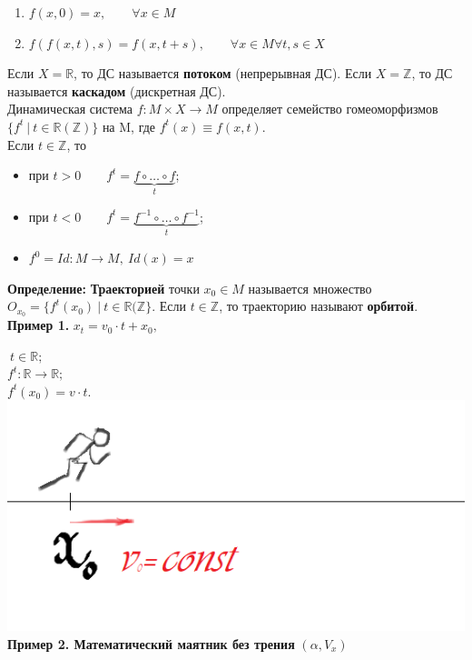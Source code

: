 \documentclass[12pt,a4paper]{article}
\begin{document}
\begin{enumerate}
\item $f(x,0) = x,\qquad \forall x \in M$
\item $f(f(x,t),s) = f(x, t+s),\qquad \forall x \in M \forall t,s \in X$ 
\end{enumerate} 

Если $X = \mathbb{R}$, то ДС называется \textbf{потоком} (непрерывная ДС).
Если $X = \mathbb{Z}$, то ДС называется \textbf{каскадом} (дискретная ДС).\\

Динамическая система $f:M\times X \rightarrow M$ определяет семейство гомеоморфизмов $\{ f^t~|~ t \in \mathbb{R}(\mathbb{Z}) \}$ на M, где $f^t(x) \equiv f(x,t)$. \\

Если $t \in \mathbb{Z}$, то
\begin{itemize}
\item при $t > 0 \qquad f^t = \underbrace{f \circ \ldots \circ f}_t$;
\item при $t < 0 \qquad f^t = \underbrace{f^{-1} \circ \ldots \circ f^{-1}}_t$;
\item $f^0 = Id:M \rightarrow M, ~ Id(x) = x$
\end{itemize}

\textbf{\large{Определение:}} \textbf{Траекторией} точки $x_0 \in M$ называется множество $O_{x_0} = \{f^t(x_0)~|~ t \in \mathbb{R(\mathbb{Z}} \}$. Если $t \in \mathbb{Z}$, то траекторию называют \textbf{орбитой}.\\

\textbf{Пример 1.} 
$x_t = v_0\cdot t + x_0,$

$~ t\in \mathbb{R};$\\

$f^t:\mathbb{R} \rightarrow \mathbb{R};$\\

$f^t(x_0) = v\cdot t.$
\includegraphics[scale = 0.45]{images/Section 3. Dinamic System/runner}
\newpage \textbf{Пример 2. Математический маятник без трения} 
$ (\alpha ,V_x)$
\end{document}

